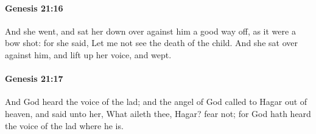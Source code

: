 		\paragraph{Genesis 21:16} %
			\label{GENESIS-21-16}

			And she went, and sat her down over against him a good way off, as it were a bow shot: for she said, Let me not see the death of the child. And she sat over against him, and lift up her voice, and wept.


		\paragraph{Genesis 21:17} %
			\label{GENESIS-21-17}

			And God heard the voice of the lad; and the angel of God called to Hagar out of heaven, and said unto her, What aileth thee, Hagar? fear not; for God hath heard the voice of the lad where he is.

